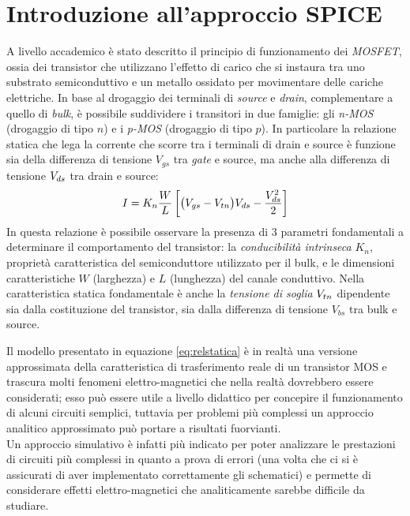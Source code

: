\section{Introduzione all'approccio SPICE}
	
	A livello accademico è stato descritto il principio di funzionamento dei \textit{MOSFET}, ossia dei transistor che utilizzano l'effetto di carico che si instaura tra uno substrato semiconduttivo e un metallo ossidato per movimentare delle cariche elettriche. In base al drogaggio dei terminali di \textit{source} e \textit{drain}, complementare a quello di \textit{bulk}, è possibile suddividere i transitori in due famiglie: gli \textit{n-MOS} (drogaggio di tipo $n$) e i \textit{p-MOS} (drogaggio di tipo $p$). In particolare la relazione statica che lega la corrente che scorre tra i terminali di drain e source è funzione sia della differenza di tensione $V_{gs}$ tra \textit{gate} e source, ma anche alla differenza di tensione $V_{ds}$ tra drain e source:
	\begin{equation} \label{eq:relstatica}
		I = K_n \frac W L \left[ \big(V_{gs} - V_{tn}\big)V_{ds} - \frac{V_{ds}^2}{2} \right]
	\end{equation} 
	In questa relazione è possibile osservare la presenza di 3 parametri fondamentali a determinare il comportamento del transistor: la \textit{conducibilità intrinseca} $K_n$, proprietà caratteristica del semiconduttore utilizzato per il bulk, e le dimensioni caratteristiche $W$ (larghezza) e $L$ (lunghezza) del canale conduttivo. Nella caratteristica statica fondamentale è anche la \textit{tensione di soglia} $V_{tn}$ dipendente sia dalla costituzione del transistor, sia dalla differenza di tensione $V_{bs}$ tra bulk e source. 
	
	Il modello presentato in equazione \ref{eq:relstatica} è in realtà una versione approssimata della caratteristica di trasferimento reale di un transistor MOS e trascura molti fenomeni elettro-magnetici che nella realtà dovrebbero essere considerati; esso può essere utile a livello didattico per concepire il funzionamento di alcuni circuiti semplici, tuttavia per problemi più complessi un approccio analitico approssimato può portare a risultati fuorvianti. \\
	Un approccio simulativo è infatti più indicato per poter analizzare le prestazioni di circuiti più complessi in quanto a prova di errori (una volta che ci si è assicurati di aver implementato correttamente gli schematici) e permette di considerare effetti elettro-magnetici che analiticamente sarebbe difficile da studiare.
	
